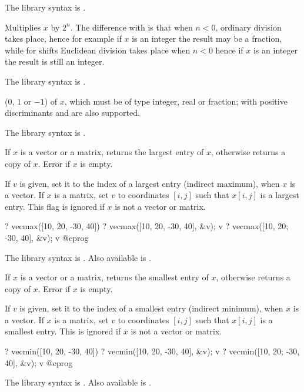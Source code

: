 The library syntax is .

\label{se:shiftmul}
Multiplies $x$ by $2^n$. The difference with
 is that when $n<0$, ordinary division takes place, hence for
example if $x$ is an integer the result may be a fraction, while for shifts
Euclidean division takes place when $n<0$ hence if $x$ is an integer the result
is still an integer.

The library syntax is .

\label{se:sign}
 ($0$, $1$ or $-1$) of $x$, which must be of
type integer, real or fraction;  with positive discriminants and
 are also supported.

The library syntax is .

\label{se:vecmax}
If $x$ is a vector or a matrix, returns the largest entry of $x$,
otherwise returns a copy of $x$. Error if $x$ is empty.

If $v$ is given, set it to the index of a largest entry (indirect maximum),
when $x$ is a vector. If $x$ is a matrix, set $v$ to coordinates $[i,j]$
such that $x[i,j]$ is a largest entry. This flag is ignored if $x$ is not a
vector or matrix.

\bprog
? vecmax([10, 20, -30, 40])
? vecmax([10, 20, -30, 40], &v); v
? vecmax([10, 20; -30, 40], &v); v
@eprog

The library syntax is .
Also available is .

\label{se:vecmin}
If $x$ is a vector or a matrix, returns the smallest entry of $x$,
otherwise returns a copy of $x$. Error if $x$ is empty.

If $v$ is given, set it to the index of a smallest entry (indirect minimum),
when $x$ is a vector. If $x$ is a matrix, set $v$ to coordinates $[i,j]$ such
that $x[i,j]$ is a smallest entry. This is ignored if $x$ is not a vector or
matrix.

\bprog
? vecmin([10, 20, -30, 40])
? vecmin([10, 20, -30, 40], &v); v
? vecmin([10, 20; -30, 40], &v); v
@eprog

The library syntax is .
Also available is .

